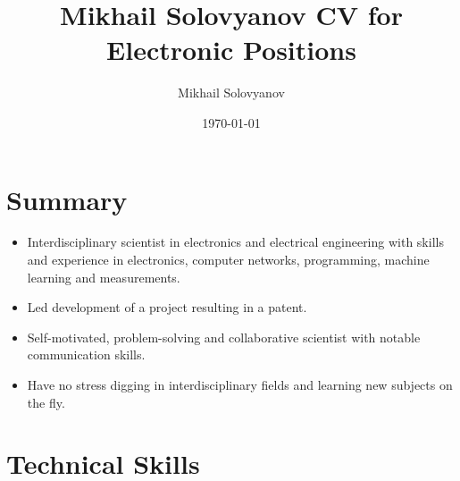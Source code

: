 \documentclass{article}
\title{ Mikhail Solovyanov CV for Electronic Positions}
\author{Mikhail Solovyanov}
\date{\today}
\begin{document}
 
 
\makecvtitle %
 
\section{Summary}
\begin{itemize}
\item Interdisciplinary scientist in electronics and electrical engineering with skills and experience in electronics, computer networks, programming, machine learning and measurements.
\item Led development of a  project resulting in a patent.
\item Self-motivated, problem-solving and collaborative scientist with notable communication skills.
\item Have no stress digging in interdisciplinary fields and learning new subjects on the fly.
\end{itemize}
 
\section{Technical Skills}
 
\end{document}
